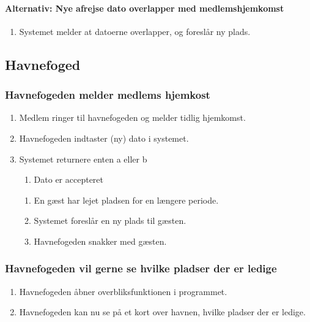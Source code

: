 \begin{enumerate}
    \paragraph{Alternativ: Nye afrejse dato overlapper med medlemshjemkomst}
      \begin{enumerate}
        \item Systemet melder at datoerne overlapper, og foreslår ny plads.
      \end{enumerate}

  \end{enumerate}



\subsection{Havnefoged}

    \subsubsection{Havnefogeden melder medlems hjemkost}

    \begin{enumerate}
      \item Medlem ringer til havnefogeden og melder tidlig hjemkomst.
      \item Havnefogeden indtaster (ny) dato i systemet.
      \item Systemet returnere enten a eller b
      \begin{enumerate}
        \item Dato er accepteret
      \end{enumerate}
      \begin{enumerate}
        \item En gæst har lejet pladsen for en længere periode.
        \item Systemet foreslår en ny plads til gæsten.
        \item Havnefogeden snakker med gæsten.
        \end{enumerate}
      \end{enumerate}
    


\subsubsection{Havnefogeden vil gerne se hvilke pladser der er ledige}
    \begin{enumerate}
      \item Havnefogeden åbner overbliksfunktionen i programmet.
      \item Havnefogeden kan nu se på et kort over havnen, hvilke pladser der er ledige.
    \end{enumerate}

